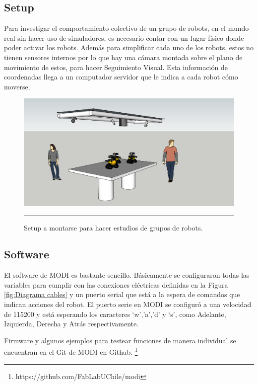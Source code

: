 \subsection{Setup}

Para investigar el comportamiento colectivo de un grupo de robots, en el mundo real sin hacer uso de simuladores, es necesario contar con un lugar físico donde poder activar los robots. Además para simplificar cada uno de los robots, estos no tienen sensores internos por lo que hay una cámara montada sobre el plano de movimiento de estos, para hacer Seguimiento Visual. Esta información de coordenadas llega a un computador servidor que le indica a cada robot cómo moverse.
\begin{figure}[htbp]
	\centering
		\includegraphics[width=\textwidth]{./Figures/setup.png}
		\rule{35em}{0.5pt}
	\caption[Setup Enjambre MODI]{Setup a montarse para hacer estudios de grupos de robots.}
	\label{fig:setup}
\end{figure}

\subsection{Software}

El software de MODI es bastante sencillo. Básicamente se configuraron todas las variables para cumplir con las conexiones eléctricas definidas en la Figura \ref{fig:Diagrama cables} y un puerto serial que está a la espera de comandos que indican acciones del robot. El puerto serie en MODI se configuró a una velocidad de 115200 y está esperando los caracteres ‘w’,’a’,’d’ y ‘s’, como Adelante, Izquierda, Derecha y Atrás respectivamente. 

Firmware y algunos ejemplos para testear funciones de manera individual se encuentran en el Git de MODI en Github. \footnote{https://github.com/FabLabUChile/modi}


